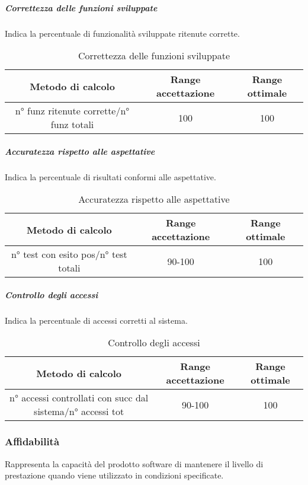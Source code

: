 			\subparagraph{Correttezza delle funzioni sviluppate}
			Indica la percentuale di funzionalità sviluppate ritenute corrette.
				\begin{table}[H]
					\begin{center}
						\begin{tabular}{|c|c|c|}
							\hline
							\textbf{Metodo di calcolo} & \textbf{Range accettazione} & \textbf{Range ottimale} \\
							\hline
							n° funz ritenute corrette/n° funz totali & 100 & 100 \\
							\hline
						\end{tabular}
					\end{center}
					\caption{Correttezza delle funzioni sviluppate}
				\end{table}
			
			\subparagraph{Accuratezza rispetto alle aspettative}
			Indica la percentuale di risultati conformi alle aspettative.
				\begin{table}[H]
					\begin{center}
						\begin{tabular}{|c|c|c|}
							\hline
							\textbf{Metodo di calcolo} & \textbf{Range accettazione} & \textbf{Range ottimale} \\
							\hline
							n° test con esito pos/n° test totali & 90-100 & 100 \\
							\hline
						\end{tabular}
					\end{center}
					\caption{Accuratezza rispetto alle aspettative}
				\end{table}
			
			\subparagraph{Controllo degli accessi}
			Indica la percentuale di accessi corretti al sistema.
			\begin{table}[H]
				\begin{center}
					\begin{tabular}{|c|c|c|}
						\hline
						\textbf{Metodo di calcolo} & \textbf{Range accettazione} & \textbf{Range ottimale} \\
						\hline
						n° accessi controllati con succ dal sistema/n° accessi tot & 90-100 & 100 \\
						\hline
					\end{tabular}
				\end{center}
				\caption{Controllo degli accessi}
			\end{table}
	
	\subsubsection{Affidabilità}
	Rappresenta la capacità del prodotto software di mantenere il livello di prestazione quando viene utilizzato in condizioni specificate.
		
